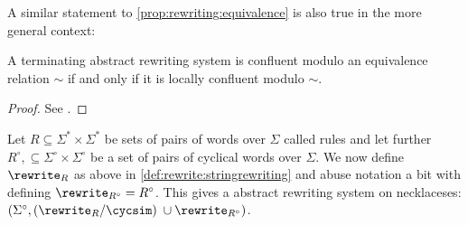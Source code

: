 A similar statement to \autoref{prop:rewriting:equivalence} is also true in the more general context:

\begin{proposition}
A terminating abstract rewriting system is confluent modulo an equivalence relation $\sim$ if and only if it is locally confluent modulo $\sim$.
\begin{proof}
See \cite{huet1980confluent}.
\end{proof}
\end{proposition}

\begin{definition} 
Let $R \subseteq \Sigma^\ast \times \Sigma^\ast$ be sets of pairs of words over $\Sigma$ called rules and let further $R^\circ, \subseteq \Sigma^\circ \times \Sigma^\circ$ be a set of pairs of cyclical words over $\Sigma$. We now define $\rewrite_R$ as above in \autoref{def:rewrite:stringrewriting} and abuse notation a bit with defining $\rewrite_{R^\circ} = R^\circ$. This gives a abstract rewriting system on necklaceses: $(\Sigma^\circ, (\rewrite_R / \cycsim)\;\cup \rewrite_{R^\circ})$.
\end{definition}


\begin{definition}

\end{definition}

\begin{proposition}

\end{proposition}